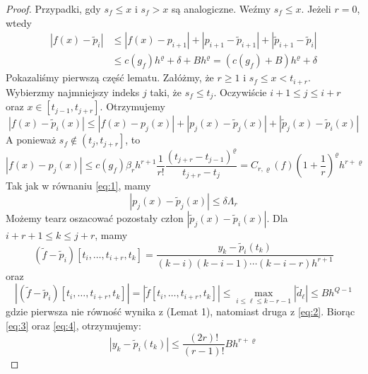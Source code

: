 \documentclass[oik, pdftex, robocza, man]{mgrwms}
\begin{document}
    \begin{proof}
        Przypadki, gdy $s_{f} \leq x$ i $s_{f} > x$ są analogiczne. Weźmy $s_{f} \leq x$. Jeżeli $r=0$, wtedy
        \begin{equation*}
            \begin{aligned}
                \left|f(x)-\tilde{p}_{i}\right| & \leq\left|f(x)-p_{i+1}\right|+\left|p_{i+1}-\tilde{p}_{i+1}\right|+\left|\tilde{p}_{i+1}-\tilde{p}_{i}\right| \\
                & \leq c\left(g_{f}\right) h^{\varrho}+\delta+B h^{\varrho}=\left(c\left(g_{f}\right)+B\right) h^{\varrho}+\delta
            \end{aligned}    
        \end{equation*}
        Pokazaliśmy pierwszą część lematu.
        Załóżmy, że $r \geq 1$ i $s_{f} \leq x<t_{i+r}$. Wybierzmy najmniejszy indeks $j$ taki, że $s_{f} \leq t_{j}$. Oczywiście $i+1 \leq j \leq i+r$ oraz $x \in\left[t_{j-1}, t_{j+r}\right]$. 
        Otrzymujemy
        \begin{equation} \label{eq:6}
            \left|f(x)-\tilde{p}_{i}(x)\right| \leq\left|f(x)-p_{j}(x)\right|+\left|p_{j}(x)-\tilde{p}_{j}(x)\right|+\left|\tilde{p}_{j}(x)-\tilde{p}_{i}(x)\right|
        \end{equation}
        A ponieważ $s_{f} \notin\left(t_{j}, t_{j+r}\right]$, to
        \begin{equation*}
            \left|f(x)-p_{j}(x)\right| \leq c\left(g_{f}\right) \beta_{r} h^{r+1} \frac{1}{r !} \frac{\left(t_{j+r}-t_{j-1}\right)^{\varrho}}{t_{j+r}-t_{j}}=C_{r, \varrho}(f)\left(1+\frac{1}{r}\right)^{\varrho} h^{r+\varrho}
        \end{equation*}
        Tak jak w równaniu \ref{eq:1}, mamy
        \begin{equation*}
            \left|p_{j}(x)-\tilde{p}_{j}(x)\right| \leq \delta \Lambda_{r}            
        \end{equation*}
        Możemy tearz oszacować pozostały człon $\left|\tilde{p}_{j}(x)-\tilde{p}_{i}(x)\right|$. Dla $i+r+1 \leq k \leq j+r$, mamy
        \begin{equation} \label{eq:3}
            \left(\tilde{f}-\tilde{p}_{i}\right)\left[t_{i}, \ldots, t_{i+r}, t_{k}\right]=\frac{y_{k}-\tilde{p}_{i}\left(t_{k}\right)}{(k-i)(k-i-1) \cdots(k-i-r) h^{r+1}}
        \end{equation}
        oraz
        \begin{equation} \label{eq:4}
            \left|\left(\tilde{f}-\tilde{p}_{i}\right)\left[t_{i}, \ldots, t_{i+r}, t_{k}\right]\right|=\left|\tilde{f}\left[t_{i}, \ldots, t_{i+r}, t_{k}\right]\right| \leq \max _{i \leq \ell \leq k-r-1}\left|\tilde{d}_{\ell}\right| \leq B h^{Q-1}            
        \end{equation}
        gdzie pierwsza nie równość wynika z \cite{UA}(Lemat 1), natomiast druga z \ref{eq:2}. Biorąc \ref{eq:3} oraz \ref{eq:4}, otrzymujemy:
        \begin{equation} \label{eq:5}
            \left|y_{k}-\tilde{p}_{i}\left(t_{k}\right)\right| \leq \frac{(2 r) !}{(r-1) !} B h^{r+\varrho}
        \end{equation}


\end{proof}
\end{document}
